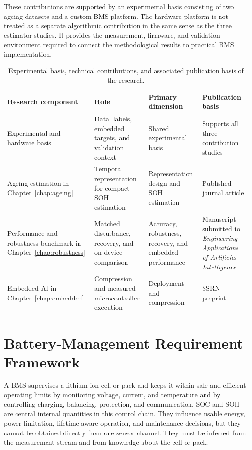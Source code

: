 \documentclass[
    a4paper,
    12pt,
    titlepage,
    bibliography=totoc,
    twoside=on,
    parskip=false,
    numbers=noenddot,
    cleardoublepage=empty,
    DIV=12,
    BCOR=12.0mm,
    headheight=36pt,
    headings=openright
]{scrreprt}
\begin{document}
These contributions are supported by an experimental basis consisting of two ageing datasets and a custom BMS platform. The hardware platform is not treated as a separate algorithmic contribution in the same sense as the three estimator studies. It provides the measurement, firmware, and validation environment required to connect the methodological results to practical BMS implementation.

\begin{table}[htbp]
    \centering
    \small
    \setlength{\tabcolsep}{3.5pt}
    \caption[Research components and publication basis.]{Experimental basis, technical contributions, and associated publication basis of the research.}
    \label{tab:publication_map}
    \begin{tabularx}{\textwidth}{>{\raggedright\arraybackslash}p{3.0cm}>{\raggedright\arraybackslash}p{4.3cm}>{\raggedright\arraybackslash}p{3.2cm}>{\raggedright\arraybackslash}X}
        \toprule
        Research component & Role & Primary dimension & Publication basis \\
        \midrule
        Experimental and hardware basis & Data, labels, embedded targets, and validation context & Shared experimental basis & Supports all three contribution studies \\
        Ageing estimation in Chapter~\ref{chap:ageing} & Temporal representation for compact SOH estimation & Representation design and SOH estimation & Published journal article\autocite{rzepkaNeuralNetworkArchitecture2023a} \\
        Performance and robustness benchmark in Chapter~\ref{chap:robustness} & Matched disturbance, recovery, and on-device comparison & Accuracy, robustness, recovery, and embedded performance & Manuscript submitted to \emph{Engineering Applications of Artificial Intelligence}\autocite{rzepkaPerformanceBenchmarkSubmitted2026} \\
        Embedded AI in Chapter~\ref{chap:embedded} & Compression and measured microcontroller execution & Deployment and compression & SSRN preprint\autocite{rzepkaEmbeddedArtificialIntelligence2026} \\
        \bottomrule
    \end{tabularx}
\end{table}

\chapter{Battery-Management Requirement Framework}
\label{chap:requirements}
A BMS supervises a lithium-ion cell or pack and keeps it within safe and efficient operating limits by monitoring voltage, current, and temperature and by controlling charging, balancing, protection, and communication. SOC and SOH are central internal quantities in this control chain. They influence usable energy, power limitation, lifetime-aware operation, and maintenance decisions, but they cannot be obtained directly from one sensor channel. They must be inferred from the measurement stream and from knowledge about the cell or pack.\autocite{plettBatteryManagementSystems2015,zhouStateEstimationModels2023a,jiangAdvancesBatteryState2024}
\end{document}
